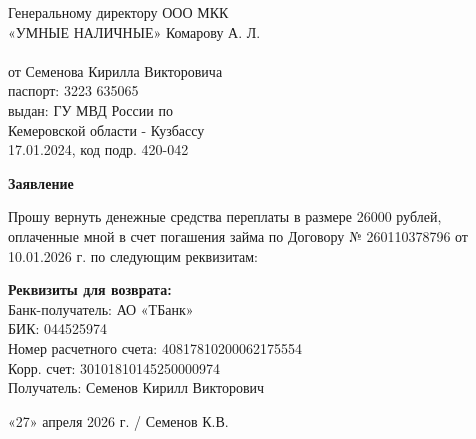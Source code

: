 \documentclass[12pt,a4paper]{article}
\begin{document}
\begin{flushright}
\begin{minipage}{0.5\textwidth}
    Генеральному директору ООО МКК\\
    «УМНЫЕ НАЛИЧНЫЕ» Комарову А. Л.\\
    \\
    от Семенова Кирилла Викторовича\\
    паспорт: 3223 635065\\
    выдан: ГУ МВД России по\\
    Кемеровской области - Кузбассу\\
    17.01.2024, код подр. 420-042
\end{minipage}
\end{flushright}

\vspace{2cm}

\begin{center}
    \textbf{\Large Заявление}
\end{center}

\vspace{1cm}

Прошу вернуть денежные средства переплаты в размере 26000 рублей, оплаченные мной в счет погашения займа по Договору № 260110378796 от 10.01.2026 г. по следующим реквизитам:

\vspace{0.8cm}

\noindent \textbf{Реквизиты для возврата:}\\
Банк-получатель: АО «ТБанк»\\
БИК: 044525974\\
Номер расчетного счета: 40817810200062175554\\
Корр. счет: 30101810145250000974\\
Получатель: Семенов Кирилл Викторович

\vspace{3cm}

\noindent «27» апреля 2026 г. \hfill \underline{\hspace{4cm}} / Семенов К.В.
\end{document}
